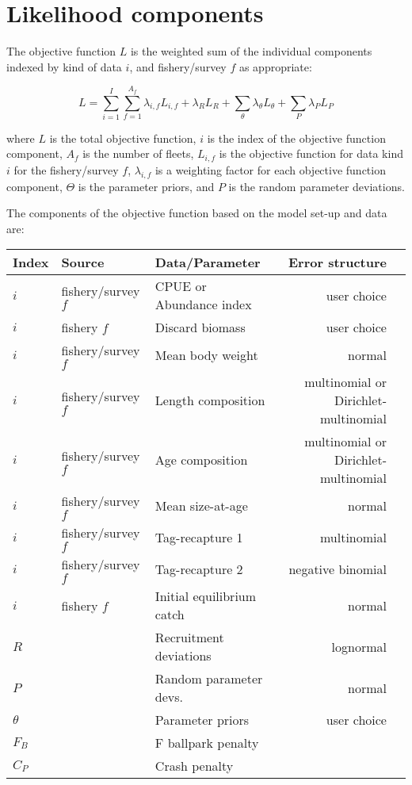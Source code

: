 \section{Likelihood components}

The objective function $L$ is the weighted sum of the individual components
indexed by kind of data $i$, and fishery/survey $f$ as appropriate:

\begin{equation}
	L = \sum_{i=1}^{I}\sum_{f=1}^{A_f}\lambda_{i,f} L_{i,f}+\lambda_R L_R + \sum_{\theta}^{}\lambda_\theta L_\theta + \sum_{P}^{}\lambda_P L_P
\end{equation}

where $L$ is the total objective function, $i$ is the index of the objective
function component, $A_f$ is the number of fleets, $L_{i,f}$ is the
objective function for data kind $i$ for the fishery/survey $f$,
$\lambda_{i,f}$ is a weighting factor for each objective function component,
$\Theta$ is the parameter priors, and $P$ is the random parameter deviations.

The components of the objective function based on the model set-up and data are: 

\begin{longtable}{p{1cm} p{3.5cm} p{5.5cm} Rp{5cm}}
	\hline
	Index & Source & Data/Parameter & Error structure\Tstrut\Bstrut\\
	\hline	
	$i$ & fishery/survey $f$ & CPUE or Abundance index & user choice \Tstrut\\
	$i$ & fishery $f$        & Discard biomass         & user choice \Tstrut\\
	$i$ & fishery/survey $f$ & Mean body weight        & normal \Tstrut\\
	$i$ & fishery/survey $f$ & Length composition      & multinomial or Dirichlet-multinomial\Tstrut\\
	$i$ & fishery/survey $f$ & Age composition         & multinomial or Dirichlet-multinomial\Tstrut\\
	$i$ & fishery/survey $f$ & Mean size-at-age        & normal \Tstrut\\
	$i$ & fishery/survey $f$ & Tag-recapture 1         & multinomial \Tstrut\\
	$i$ & fishery/survey $f$ & Tag-recapture 2         & negative binomial\Tstrut\\
	$i$ & fishery $f$        & Initial equilibrium catch & normal \Tstrut\\
	$R$ & 					 & Recruitment deviations  & lognormal \Tstrut\\
	$P$ & 					 & Random parameter devs.  & normal \Tstrut\\
	$\theta$ & 				 & Parameter priors	       & user choice\Tstrut\\
	$F_B$ & 				 & F ballpark penalty	   &  \Tstrut\\
	$C_P$ &				     & Crash penalty           &  \Tstrut\Bstrut\\
	\hline
\end{longtable}

